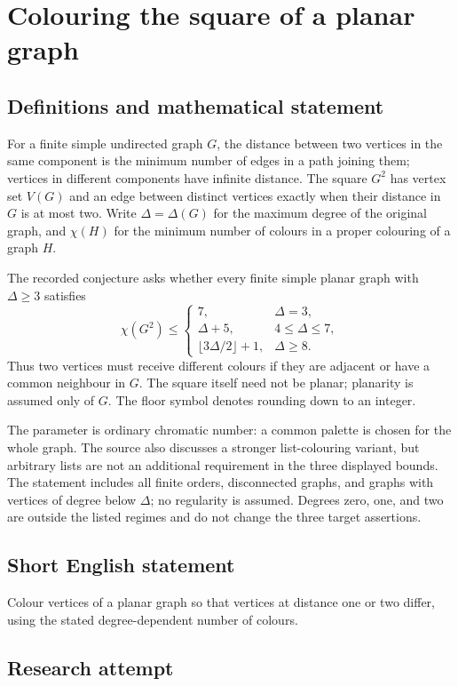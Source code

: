 \documentclass[11pt,a4paper]{article}
\begin{document}
\section*{Colouring the square of a planar graph}\label{statement}

\subsection{Definitions and mathematical statement}
For a finite simple undirected graph $G$, the distance between two vertices
in the same component is the minimum number of edges in a path joining
them; vertices in different components have infinite distance. The square
$G^2$ has vertex set $V(G)$ and an edge between distinct vertices exactly
when their distance in $G$ is at most two. Write $\Delta=\Delta(G)$ for
the maximum degree of the original graph, and $\chi(H)$ for the minimum
number of colours in a proper colouring of a graph $H$.

The recorded conjecture asks whether every finite simple planar graph
with $\Delta\ge3$ satisfies
\[
 \chi(G^2)\le
 \begin{cases}
  7,&\Delta=3,\\
  \Delta+5,&4\le\Delta\le7,\\
  \lfloor3\Delta/2\rfloor+1,&\Delta\ge8.
 \end{cases}
\]
Thus two vertices must receive different colours if they are adjacent
or have a common neighbour in $G$. The square itself need not be planar;
planarity is assumed only of $G$. The floor symbol denotes rounding down
to an integer.

The parameter is ordinary chromatic number: a common palette is chosen
for the whole graph. The source also discusses a stronger list-colouring
variant, but arbitrary lists are not an additional requirement in the
three displayed bounds. The statement includes all finite orders,
disconnected graphs, and graphs with vertices of degree below $\Delta$;
no regularity is assumed. Degrees zero, one, and two are outside the
listed regimes and do not change the three target assertions.
\subsection{Short English statement}
Colour vertices of a planar graph so that vertices at distance one or two differ, using the stated degree-dependent number of colours.
\subsection{Research attempt}
\end{document}
